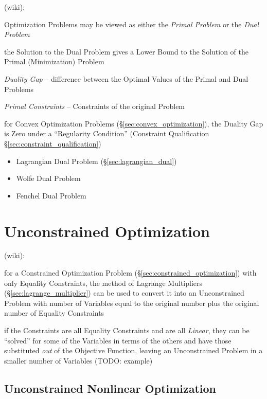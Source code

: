 (wiki):

Optimization Problems may be viewed as either the \emph{Primal Problem} or the
\emph{Dual Problem}

the Solution to the Dual Problem gives a Lower Bound to the Solution of the
Primal (Minimization) Problem

\emph{Duality Gap} -- difference between the Optimal Values of the Primal and
Dual Problems

\emph{Primal Constraints} -- Constraints of the original Problem

for Convex Optimization Problems (\S\ref{sec:convex_optimization}), the Duality
Gap is Zero under a ``Regularity Condition'' (Constraint Qualification
\S\ref{sec:constraint_qualification})

\begin{itemize}
  \item Lagrangian Dual Problem (\S\ref{sec:lagrangian_dual})
  \item Wolfe Dual Problem
  \item Fenchel Dual Problem
\end{itemize}



\section{Unconstrained Optimization}\label{sec:unconstrained_optimization}

(wiki):

for a Constrained Optimization Problem (\S\ref{sec:constrained_optimization})
with only Equality Constraints, the method of Lagrange Multipliers
(\S\ref{sec:lagrange_multiplier}) can be used to convert it into an
Unconstrained Problem with number of Variables equal to the original number
plus the original number of Equality Constraints

if the Constraints are all Equality Constraints and are all \emph{Linear}, they
can be ``solved'' for some of the Variables in terms of the others and have
those substituted \emph{out} of the Objective Function, leaving an
Unconstrained Problem in a smaller number of Variables (TODO: example)



\subsection{Unconstrained Nonlinear Optimization}
\label{sec:unconstrained_nonlinear}

